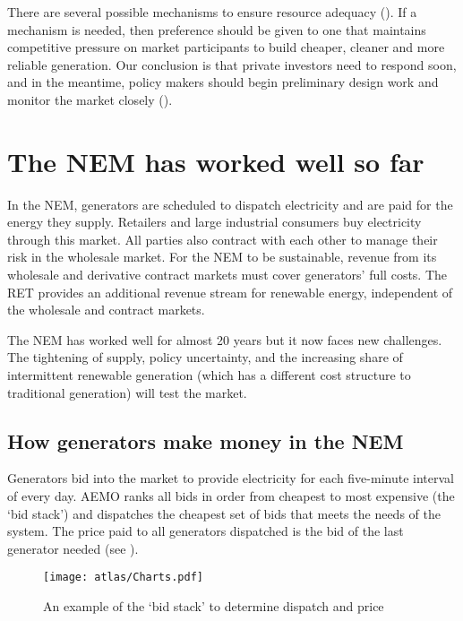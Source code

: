 \documentclass[FrontPage]{grattan}
\begin{document}
There are several possible mechanisms to ensure resource adequacy (). If a mechanism is needed, then preference should be given to one that maintains competitive pressure on market participants to build cheaper, cleaner and more reliable generation. Our conclusion is that private investors need to respond soon, and in the meantime, policy makers should begin preliminary design work and monitor the market closely ().



\chapter{The NEM has worked well so far}\label{chap:how-the-market-incentivises-new-investment}
In the NEM, generators are scheduled to dispatch electricity and are paid for the energy they supply. Retailers and large industrial consumers buy electricity through this market. All parties also contract with each other to manage their risk in the wholesale market. For the NEM to be sustainable, revenue from its wholesale and derivative contract markets must cover generators' full costs. The RET provides an additional revenue stream for renewable energy, independent of the wholesale and contract markets. 

The NEM has worked well for almost 20 years but it now faces new challenges. The tightening of supply, policy uncertainty, and the increasing share of intermittent renewable generation (which has a different cost structure to traditional generation) will test the market.

\section{How generators make money in the NEM}\label{sec:how-generators-make-money-in-the-NEM}
Generators bid into the market to provide electricity for each five-minute interval of every day. AEMO ranks all bids in order from cheapest to most expensive (the `bid stack') and dispatches the cheapest set of bids that meets the needs of the system. The price paid to all generators dispatched is the bid of the last generator needed (see ).

\begin{figure}
\caption{An example of the `bid stack' to determine dispatch and price}\label{fig:scheduling-of-NEM-generators}
\texttt{[image: atlas/Charts.pdf]}
\end{figure}
\end{document}
